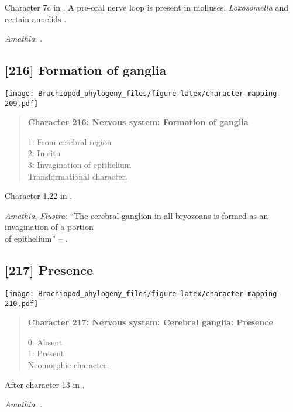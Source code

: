 \documentclass[openany]{book}
\theoremstyle{definition}
\theoremstyle{definition}
\theoremstyle{definition}
\theoremstyle{remark}
\begin{document}
Character 7c in \citet{Haszprunar2008}. A pre-oral nerve loop is present
in molluscs, \emph{Loxosomella} and certain annelids
\citep{Wanninger2007}.

\hypertarget{Amathia-coding-215}{}
\emph{Amathia}: \citet{Temereva2016Thenervous}.

\subsection*{{[}216{]} Formation of ganglia}\label{formation-of-ganglia}

\texttt{[image: Brachiopod\_phylogeny\_files/figure-latex/character-mapping-209.pdf]}

\begin{quote}
\textbf{Character 216: Nervous system: Formation of ganglia}

1: From cerebral region\\
2: In situ\\
3: Invagination of epithelium\\
Transformational character.
\end{quote}

Character 1.22 in \citet{SPS1996}.

\hypertarget{Amathia-coding-216}{}
\emph{Amathia}, \emph{Flustra}: ``The cerebral ganglion in all bryozoans
is formed as an invagination of a portion\\
of epithelium'' -- \citet{Temereva2016Thenervous}.

\subsection*{{[}217{]} Presence}\label{presence-5}

\texttt{[image: Brachiopod\_phylogeny\_files/figure-latex/character-mapping-210.pdf]}

\begin{quote}
\textbf{Character 217: Nervous system: Cerebral ganglia: Presence}

0: Absent\\
1: Present\\
Neomorphic character.
\end{quote}

After character 13 in \citet{Haszprunar1996}.

\hypertarget{Amathia-coding-217}{}
\emph{Amathia}: \citet{Temereva2016Thenervous}.
\end{document}
